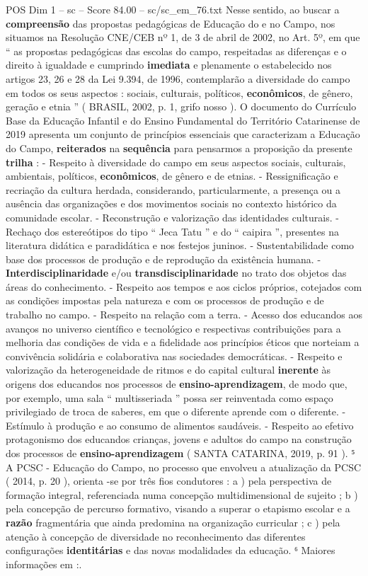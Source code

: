 \begin{textsample}{POS Dim 1 – sc – Score 84.00 – sc/sc\_em\_76.txt}
Nesse sentido, ao buscar a \textbf{compreensão} das propostas pedagógicas de Educação do e no Campo, nos situamos na Resolução CNE/CEB nº 1, de 3 de abril de 2002, no Art. 5º, em que “ as propostas pedagógicas das escolas do campo, respeitadas as diferenças e o direito à igualdade e cumprindo \textbf{imediata} e plenamente o estabelecido nos artigos 23, 26 e 28 da Lei 9.394, de 1996, contemplarão a diversidade do campo em todos os seus aspectos : sociais, culturais, políticos, \textbf{econômicos}, de gênero, geração e etnia ” ( BRASIL, 2002, p. 1, grifo nosso ).
O documento do Currículo Base da Educação Infantil e do Ensino Fundamental do Território Catarinense de 2019 apresenta um conjunto de princípios essenciais que caracterizam a Educação do Campo, \textbf{reiterados} na \textbf{sequência} para pensarmos a proposição da presente \textbf{trilha} : - Respeito à diversidade do campo em seus aspectos sociais, culturais, ambientais, políticos, \textbf{econômicos}, de gênero e de etnias. - Ressignificação e recriação da cultura herdada, considerando, particularmente, a presença ou a ausência das organizações e dos movimentos sociais no contexto histórico da comunidade escolar. - Reconstrução e valorização das identidades culturais. - Rechaço dos estereótipos do tipo “ Jeca Tatu ” e do “ caipira ”, presentes na literatura didática e paradidática e nos festejos juninos. - Sustentabilidade como base dos processos de produção e de reprodução da existência humana. - \textbf{Interdisciplinaridade} e/ou \textbf{transdisciplinaridade} no trato dos objetos das áreas do conhecimento. - Respeito aos tempos e aos ciclos próprios, cotejados com as condições impostas pela natureza e com os processos de produção e de trabalho no campo. - Respeito na relação com a terra. - Acesso dos educandos aos avanços no universo científico e tecnológico e respectivas contribuições para a melhoria das condições de vida e a fidelidade aos princípios éticos que norteiam a convivência solidária e colaborativa nas sociedades democráticas. - Respeito e valorização da heterogeneidade de ritmos e do capital cultural \textbf{inerente} às origens dos educandos nos processos de \textbf{ensino-aprendizagem}, de modo que, por exemplo, uma sala “ multisseriada ” possa ser reinventada como espaço privilegiado de troca de saberes, em que o diferente aprende com o diferente. - Estímulo à produção e ao consumo de alimentos saudáveis. - Respeito ao efetivo protagonismo dos educandos crianças, jovens e adultos do campo na construção dos processos de \textbf{ensino-aprendizagem} ( SANTA CATARINA, 2019, p. 91 ). ⁵ A PCSC - Educação do Campo, no processo que envolveu a atualização da PCSC ( 2014, p. 20 ), orienta -se por três fios condutores : a ) pela perspectiva de formação integral, referenciada numa concepção multidimensional de sujeito ; b ) pela concepção de percurso formativo, visando a superar o etapismo escolar e a \textbf{razão} fragmentária que ainda predomina na organização curricular ; c ) pela atenção à concepção de diversidade no reconhecimento das diferentes configurações \textbf{identitárias} e das novas modalidades da educação. ⁶ Maiores informações em :.

\end{textsample}
